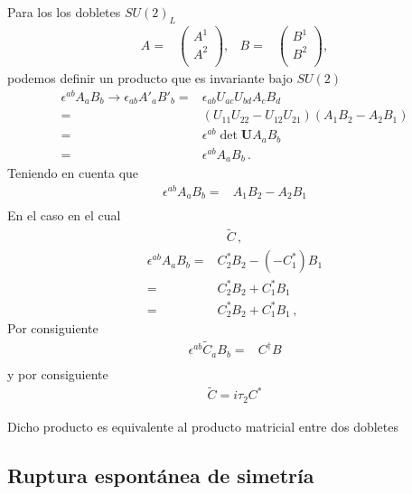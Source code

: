\begin{frame}
Para los los dobletes  $SU(2)_L$ 
\begin{align}
  A=&
  \begin{pmatrix}
    A^1\\
    A^2\\
  \end{pmatrix},&
  B=&
  \begin{pmatrix}
    B^1\\
    B^2\\
  \end{pmatrix},
\end{align}
podemos definir un producto que es invariante bajo $SU(2)$
\begin{align}
\epsilon^{ab}A_a B_b\to \epsilon_{ab}A'_a B'_b=&\epsilon_{ab}U_{ac}U_{bd}A_c B_d\nonumber\\
  =&\left( U_{11}U_{22}-U_{12}U_{21} \right)\left(A_1B_2-A_2B_1  \right)\nonumber\\
  =&\epsilon^{ab}\det\mathbf{U} A_a B_b\nonumber\\
  =&\epsilon^{ab} A_a B_b\,.
\end{align}
Teniendo en cuenta que
\begin{align}
  \epsilon^{ab}A_a B_b=&A_1 B_2-A_2 B_1 \nonumber\\
 \end{align}
En el caso en el cual
\begin{align}
 \widetilde{C}\,,
\end{align}
\begin{align}
  \epsilon^{ab}A_a B_b=&C_2^{*}B_2 -(-C_1^{*}) B_1 \nonumber\\
                     =&C_2^{*}B_2 +C_1^{*} B_1 \nonumber\\
                     =&C_2^{*}B_2 +C_1^{*} B_1 \,,
 \end{align}
Por consiguiente
\begin{align}
   \epsilon^{ab}\widetilde{C}_{a} B_{b} =&C^{\dagger} B \nonumber\\
 \end{align}
y por consiguiente
\begin{align}
\widetilde{C}= i\tau_2 C^{*}
\end{align}


Dicho producto es equivalente al producto matricial entre dos dobletes

\subsection{Ruptura espontánea de simetría}



\end{frame}
